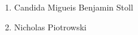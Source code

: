 \begin{enumerate}
    \item Candida Migueis
    \Item Benjamin Stoll
    \item Nicholas Piotrowski
\end{enumerate}
